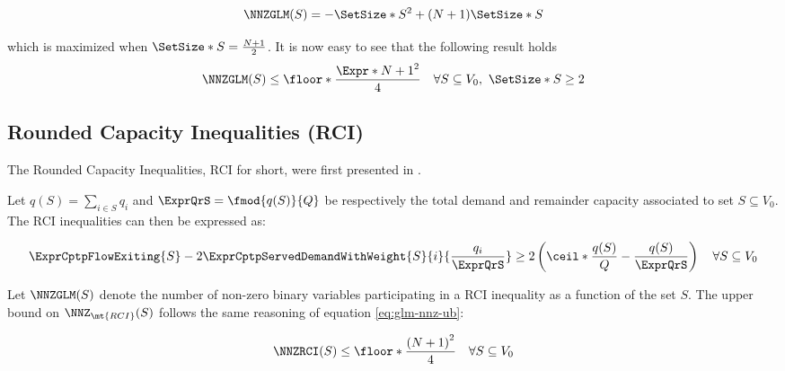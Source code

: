 \begin{equation}
	\NNZGLM(S) = -\SetSize*{S}^2 + (N + 1)\SetSize*{S}
\end{equation}

which is maximized when $\SetSize*{S} = \frac{N+1}{2}$.
It is now easy to see that the following result holds
\begin{equation}\label{eq:glm-nnz-ub}
	\NNZGLM(S) \le \floor*{ \frac{\Expr*{N + 1}^2}{4}} \quad \forall S \subseteq V_0,\ \SetSize*{S} \ge 2
\end{equation}

\subsection{Rounded Capacity Inequalities (RCI)}
The Rounded Capacity Inequalities, RCI for short, were first presented in \cite{achuthan1998}.

Let $q(S) = \sum_{i \in S} q_i$ and $\ExprQrS = \fmod{q(S)}{Q}$ be respectively the total demand and remainder capacity associated to set $S \subseteq V_0$.
The RCI inequalities can then be expressed as:

\begin{equation}\label{eq:rci-inequality}
	\begin{split}
		\ExprCptpFlowExiting{S} -2 \ExprCptpServedDemandWithWeight{S}{i}{\frac{q_i}{\ExprQrS}}   \ge   2 \left( \ceil*{ \frac{q(S)}{Q}} - \frac{q(S)}{\ExprQrS} \right) \quad \forall S \subseteq V_0
	\end{split}
\end{equation}

Let $\NNZGLM(S)$ denote the number of non-zero binary variables participating in a RCI inequality as a function of the set $S$.
The upper bound on $\NNZ_{\mt{RCI}}(S)$ follows the same reasoning of equation \eqref{eq:glm-nnz-ub}:

\begin{equation}\label{eq:rc-nnz-ub}
	\NNZRCI(S) \le \floor*{\frac{\left( N + 1\right)^2}{4}} \quad \forall S \subseteq V_0
\end{equation}
